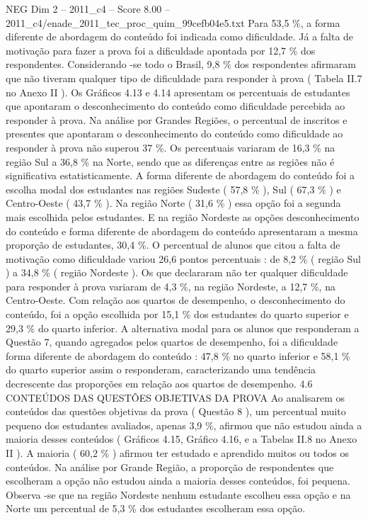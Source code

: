 \begin{textsample}{NEG Dim 2 – 2011\_c4 – Score 8.00 – 2011\_c4/enade\_2011\_tec\_proc\_quim\_99cefb04e5.txt}
Para 53,5 \%, a forma diferente de abordagem do conteúdo foi indicada como dificuldade.
Já a falta de motivação para fazer a prova foi a dificuldade apontada por 12,7 \% dos respondentes.
Considerando -se todo o Brasil, 9,8 \% dos respondentes afirmaram que não tiveram qualquer tipo de dificuldade para responder à prova ( Tabela II.7 no Anexo II ).
Os Gráficos 4.13 e 4.14 apresentam os percentuais de estudantes que apontaram o desconhecimento do conteúdo como dificuldade percebida ao responder à prova.
Na análise por Grandes Regiões, o percentual de inscritos e presentes que apontaram o desconhecimento do conteúdo como dificuldade ao responder à prova não superou 37 \%.
Os percentuais variaram de 16,3 \% na região Sul a 36,8 \% na Norte, sendo que as diferenças entre as regiões não é significativa estatisticamente.
A forma diferente de abordagem do conteúdo foi a escolha modal dos estudantes nas regiões Sudeste ( 57,8 \% ), Sul ( 67,3 \% ) e Centro-Oeste ( 43,7 \% ).
Na região Norte ( 31,6 \% ) essa opção foi a segunda mais escolhida pelos estudantes.
E na região Nordeste as opções desconhecimento do conteúdo e forma diferente de abordagem do conteúdo apresentaram a mesma proporção de estudantes, 30,4 \%.
O percentual de alunos que citou a falta de motivação como dificuldade variou 26,6 pontos percentuais : de 8,2 \% ( região Sul ) a 34,8 \% ( região Nordeste ).
Os que declararam não ter qualquer dificuldade para responder à prova variaram de 4,3 \%, na região Nordeste, a 12,7 \%, na Centro-Oeste.
Com relação aos quartos de desempenho, o desconhecimento do conteúdo, foi a opção escolhida por 15,1 \% dos estudantes do quarto superior e 29,3 \% do quarto inferior.
A alternativa modal para os alunos que responderam a Questão 7, quando agregados pelos quartos de desempenho, foi a dificuldade forma diferente de abordagem do conteúdo : 47,8 \% no quarto inferior e 58,1 \% do quarto superior assim o responderam, caracterizando uma tendência decrescente das proporções em relação aos quartos de desempenho. 4.6 CONTEÚDOS DAS QUESTÕES OBJETIVAS DA PROVA Ao analisarem os conteúdos das questões objetivas da prova ( Questão 8 ), um percentual muito pequeno dos estudantes avaliados, apenas 3,9 \%, afirmou que não estudou ainda a maioria desses conteúdos ( Gráficos 4.15, Gráfico 4.16, e a Tabelas II.8 no Anexo II ).
A maioria ( 60,2 \% ) afirmou ter estudado e aprendido muitos ou todos os conteúdos.
Na análise por Grande Região, a proporção de respondentes que escolheram a opção não estudou ainda a maioria desses conteúdos, foi pequena.
Observa -se que na região Nordeste nenhum estudante escolheu essa opção e na Norte um percentual de 5,3 \% dos estudantes escolheram essa opção.

\end{textsample}
